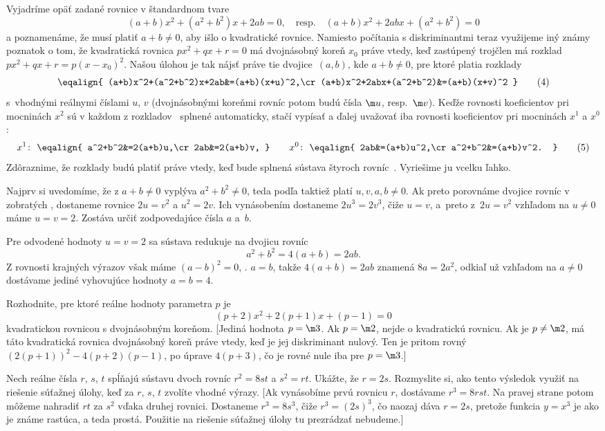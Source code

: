 {\ineriesenie
Vyjadríme opäť zadané rovnice v štandardnom tvare
$$
(a+b)x^2+(a^2+b^2)x+2ab=0,\quad\text{resp.}\quad
(a+b)x^2+2abx+(a^2+b^2)=0
$$
a poznamenáme, že musí platiť $a+b\ne0$, aby išlo o kvadratické
rovnice. Namiesto počítania s diskriminantmi teraz využijeme iný známy
poznatok o tom, že kvadratická rovnica
$px^2+qx+r=0$ má dvojnásobný koreň $x_0$ práve vtedy, keď
zastúpený trojčlen má rozklad $px^2+qx+r=p(x-x_0)^2$. Našou úlohou
je tak nájsť
práve tie dvojice~$(a,b)$, kde $a+b\ne0$, pre ktoré platia
rozklady
$$\eqalign{
(a+b)x^2+(a^2+b^2)x+2ab&=(a+b)(x+u)^2,\cr
(a+b)x^2+2abx+(a^2+b^2)&=(a+b)(x+v)^2
}\tag4
$$
s~vhodnými reálnymi číslami $u$, $v$ (dvojnásobnými koreňmi rovníc
potom budú čísla $\m u$, resp.~$\m v$). Keďže rovnosti koeficientov
pri mocninách
$x^2$ sú v každom z rozkladov~ splnené automaticky, stačí vypísať a ďalej
uvažovať iba rovnosti koeficientov pri mocninách $x^{1}$ a $x^0$:
$$
x^{1}\colon~
\eqalign{
a^2+b^2&=2(a+b)u,\cr
    2ab&=2(a+b)v,
}
\qquad
x^{0}\colon~
\eqalign{
     2ab&=(a+b)u^2,\cr
a^2+b^2&=(a+b)v^2.
}
\tag5
$$
Zdôraznime, že rozklady  budú platiť práve vtedy, keď bude
splnená sústava štyroch rovníc~. Vyriešime ju vcelku ľahko.

Najprv si uvedomíme, že z $a+b\ne0$ vyplýva $a^2+b^2\ne0$,
teda podľa  taktiež platí $u,v,a,b\ne0$. Ak preto porovnáme
dvojice rovníc v~ zobratých ,
dostaneme rovnice $2u=v^2$ a $u^2=2v$. Ich vynásobením
dostaneme $2u^3=2v^3$, čiže $u=v$, a~preto
z~$2u=v^2$ vzhľadom na $u\ne0$ máme $u=v=2$.
Zostáva určiť zodpovedajúce čísla $a$ a~$b$.

Pre odvodené hodnoty $u=v=2$ sa sústava  redukuje na
dvojicu rovníc
$$
a^2+b^2=4(a+b)=2ab.
$$
Z rovnosti krajných výrazov však máme
$(a-b)^2=0$, \tj. $a=b$, takže $4(a+b)=2ab$ znamená $8a=2a^2$,
odkiaľ už vzhľadom na $a\ne0$ dostávame jediné vyhovujúce hodnoty
$a=b=4$.

Rozhodnite, pre ktoré reálne hodnoty parametra $p$ je
$$
(p+2)x^2+2(p+1)x+(p-1)=0
$$
kvadratickou rovnicou s dvojnásobným koreňom.
[Jediná hodnota $p=\m3$.
Ak $p=\m2$, nejde o kvadratickú rovnicu. Ak je
$p\ne\m2$, má táto kvadratická rovnica dvojnásobný koreň
práve vtedy, keď je jej diskriminant nulový. Ten je pritom rovný
${(2(p+1))^2} - {4(p+2)(p-1)}$, po úprave $4(p + 3)$, čo je rovné
nule iba pre $p=\m3$.]

Nech reálne čísla $r$, $s$, $t$ spĺňajú sústavu
dvoch rovníc $r^2=8st$ a $s^2=rt$. Ukážte, že $r=2s$. Rozmyslite si, ako tento výsledok využiť na riešenie súťažnej
úlohy, keď za $r$, $s$, $t$ zvolíte vhodné výrazy.
[Ak vynásobíme prvú rovnicu $r$, dostávame $r^3 = 8rst$.
Na pravej strane potom môžeme nahradiť $rt$ za $s^2$ vďaka druhej
rovnici. Dostaneme $r^3 = 8s^3$, čiže $r^3=(2s)^3$, čo naozaj dáva
$r=2s$, pretože funkcia $y=x^3$ je ako je známe rastúca, a teda prostá. Použitie na riešenie súťažnej úlohy tu prezrádzať nebudeme.]

}
